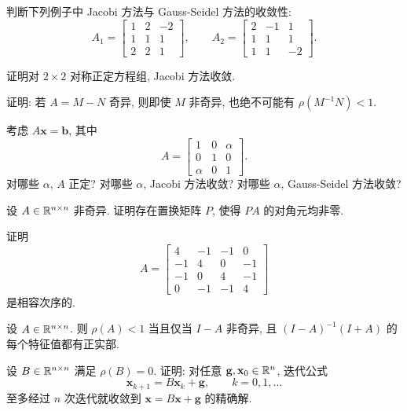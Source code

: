 \begin{exercises}
  \item 判断下列例子中 Jacobi 方法与 Gauss-Seidel 方法的收敛性:
  \[
    A_1=
    \begin{bmatrix}
      1 & 2 & -2\\
      1 & 1 & 1\\
      2 & 2 & 1
    \end{bmatrix},
    \qquad
    A_2=
    \begin{bmatrix}
      2 & -1 & 1\\
      1 & 1 & 1\\
      1 & 1 & -2
    \end{bmatrix}.
  \]

  \item 证明对 $2\times2$ 对称正定方程组, Jacobi 方法收敛.

  \item 证明: 若 $A=M-N$ 奇异, 则即使 $M$ 非奇异, 也绝不可能有 $\rho(M^{-1}N)<1$.

  \item 考虑 $A\mathbf{x}=\mathbf{b}$, 其中
  \[
    A=
    \begin{bmatrix}
      1 & 0 & \alpha\\
      0 & 1 & 0\\
      \alpha & 0 & 1
    \end{bmatrix}.
  \]
  \subquest 对哪些 $\alpha$, $A$ 正定?
  \subquest 对哪些 $\alpha$, Jacobi 方法收敛?
  \subquest 对哪些 $\alpha$, Gauss-Seidel 方法收敛?

  \item 设 $A\in\mathbb{R}^{n\times n}$ 非奇异. 证明存在置换矩阵 $P$, 使得 $PA$ 的对角元均非零.

  \item 证明
  \[
    A=
    \begin{bmatrix}
      4 & -1 & -1 & 0\\
      -1 & 4 & 0 & -1\\
      -1 & 0 & 4 & -1\\
      0 & -1 & -1 & 4
    \end{bmatrix}
  \]
  是相容次序的.

  \item 设 $A\in\mathbb{R}^{n\times n}$. 则 $\rho(A)<1$ 当且仅当 $I-A$ 非奇异, 且 $(I-A)^{-1}(I+A)$ 的每个特征值都有正实部.

  \item 设 $B\in\mathbb{R}^{n\times n}$ 满足 $\rho(B)=0$. 证明: 对任意 $\mathbf{g},\mathbf{x}_0\in\mathbb{R}^n$, 迭代公式
  \[
    \mathbf{x}_{k+1}=B\mathbf{x}_k+\mathbf{g},\qquad k=0,1,\ldots
  \]
  至多经过 $n$ 次迭代就收敛到 $\mathbf{x}=B\mathbf{x}+\mathbf{g}$ 的精确解.


\end{exercises}
